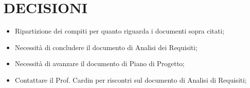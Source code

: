 \documentclass[5pt]{article}
\begin{document}
\section{DECISIONI}
\begin{itemize}
    \item Ripartizione dei compiti per quanto riguarda i documenti sopra citati;
    \item Necessità di concludere il documento di Analisi dei Requisiti;
    \item Necessità di avanzare il documento di Piano di Progetto;
    \item Contattare il Prof. Cardin per riscontri sul documento di Analisi di Requisiti;
\end{itemize}
\end{document}
